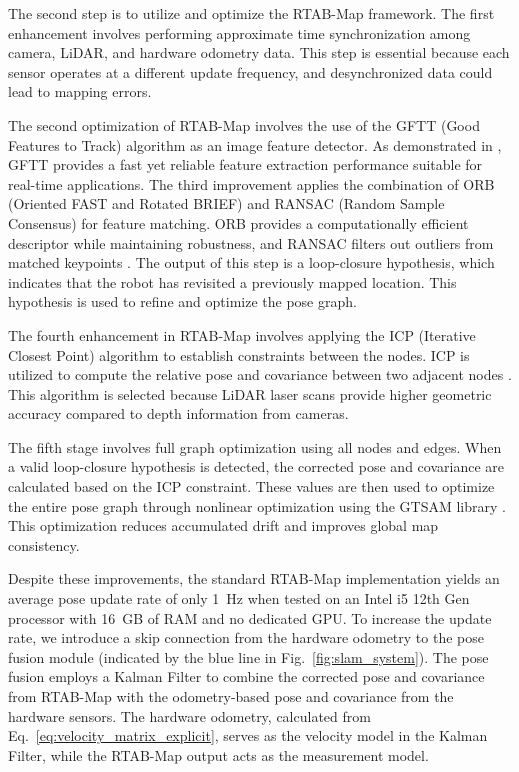 \documentclass[conference, a4paper]{IEEEtran}[2015/08/26]
\begin{document}
\par
The second step is to utilize and optimize the RTAB-Map framework. The first enhancement involves performing approximate time synchronization among camera, LiDAR, and hardware odometry data. This step is essential because each sensor operates at a different update frequency, and desynchronized data could lead to mapping errors.

\par
The second optimization of RTAB-Map involves the use of the GFTT (Good Features to Track) algorithm as an image feature detector. As demonstrated in \cite{ref_image_matching}, GFTT provides a fast yet reliable feature extraction performance suitable for real-time applications. The third improvement applies the combination of ORB (Oriented FAST and Rotated BRIEF) and RANSAC (Random Sample Consensus) for feature matching. ORB provides a computationally efficient descriptor while maintaining robustness, and RANSAC filters out outliers from matched keypoints \cite{ref_orb_ransac}. The output of this step is a loop-closure hypothesis, which indicates that the robot has revisited a previously mapped location. This hypothesis is used to refine and optimize the pose graph.

\par
The fourth enhancement in RTAB-Map involves applying the ICP (Iterative Closest Point) algorithm to establish constraints between the nodes. ICP is utilized to compute the relative pose and covariance between two adjacent nodes \cite{ref_icp}. This algorithm is selected because LiDAR laser scans provide higher geometric accuracy compared to depth information from cameras.

\par
The fifth stage involves full graph optimization using all nodes and edges. When a valid loop-closure hypothesis is detected, the corrected pose and covariance are calculated based on the ICP constraint. These values are then used to optimize the entire pose graph through nonlinear optimization using the GTSAM library \cite{ref_gtsam}. This optimization reduces accumulated drift and improves global map consistency.

\par
Despite these improvements, the standard RTAB-Map implementation yields an average pose update rate of only 1~Hz when tested on an Intel i5 12th Gen processor with 16~GB of RAM and no dedicated GPU. To increase the update rate, we introduce a skip connection from the hardware odometry to the pose fusion module (indicated by the blue line in Fig.~\ref{fig:slam_system}). The pose fusion employs a Kalman Filter to combine the corrected pose and covariance from RTAB-Map with the odometry-based pose and covariance from the hardware sensors. The hardware odometry, calculated from Eq.~\ref{eq:velocity_matrix_explicit}, serves as the velocity model in the Kalman Filter, while the RTAB-Map output acts as the measurement model.
\end{document}

